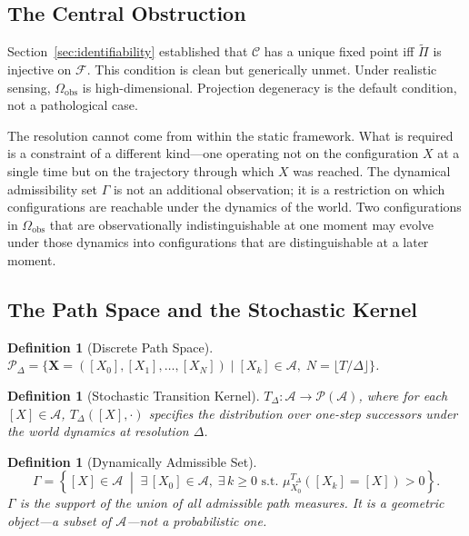 \documentclass[12pt, oneside]{article}
\newtheorem{definition}[theorem]{Definition}
\newcommand{\Ftil}{\widetilde{\Pi}}
\begin{document}
\subsection{The Central Obstruction}

Section~\ref{sec:identifiability} established that $\mathcal{C}$ has a unique fixed point
iff $\Ftil$ is injective on $\mathcal{F}$. This condition is clean but generically unmet.
Under realistic sensing, $\Omega_{\mathrm{obs}}$ is high-dimensional. Projection degeneracy
is the default condition, not a pathological case.

The resolution cannot come from within the static framework. What is required is a
constraint of a different kind---one operating not on the configuration $X$ at a single
time but on the trajectory through which $X$ was reached. The dynamical admissibility set
$\Gamma$ is not an additional observation; it is a restriction on which configurations are
reachable under the dynamics of the world. Two configurations in $\Omega_{\mathrm{obs}}$
that are observationally indistinguishable at one moment may evolve under those dynamics
into configurations that are distinguishable at a later moment.

\subsection{The Path Space and the Stochastic Kernel}

\begin{definition}[Discrete Path Space]
$\mathcal{P}_\Delta = \{ \mathbf{X} = ([X_0],[X_1],\ldots,[X_N]) \mid [X_k] \in \mathcal{A},\;
N = \lfloor T/\Delta \rfloor \}$.
\end{definition}

\begin{definition}[Stochastic Transition Kernel]
$T_\Delta : \mathcal{A} \to \mathcal{P}(\mathcal{A})$, where for each $[X] \in \mathcal{A}$,
$T_\Delta([X],\cdot)$ specifies the distribution over one-step successors under the world
dynamics at resolution $\Delta$.
\end{definition}

\begin{definition}[Dynamically Admissible Set]
\[
\Gamma = \left\{ [X] \in \mathcal{A} \;\middle|\;
\exists\, [X_0] \in \mathcal{A},\; \exists\, k \ge 0 \text{ s.t. }
\mu_{X_0}^{T_\Delta}([X_k] = [X]) > 0 \right\}.
\]
$\Gamma$ is the support of the union of all admissible path measures. It is a geometric
object---a subset of $\mathcal{A}$---not a probabilistic one.
\end{definition}
\end{document}

